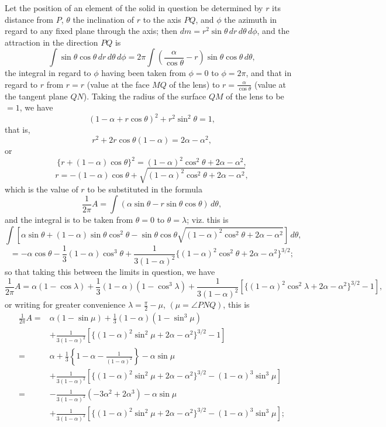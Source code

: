 \documentclass[11pt,a4paper]{article}
\theoremstyle{plain}
\theoremstyle{definition}
\begin{document}
\noindent
Let the position of an element of the solid in question be determined by $r$ its
distance from $P$, $\theta$ the inclination of $r$ to the axis $PQ$, and $\phi$ the
azimuth in regard to any fixed plane through the axis; then
$dm=r^2\sin\theta\,dr\,d\theta\,d\phi$, and the attraction in the direction $PQ$ is
\[
\int\sin\theta\cos\theta\,dr\,d\theta\,d\phi
=2\pi\int\left(\frac{\alpha}{\cos\theta}-r\right)\sin\theta\cos\theta\,d\theta,
\]
the integral in regard to $\phi$ having been taken from $\phi=0$ to $\phi=2\pi$,
and that in regard to $r$ from $r=r$ (value at the face $MQ$ of the lens) to
$r=\frac{\alpha}{\cos\theta}$ (value at the tangent plane $QN$). Taking the radius
of the surface $QM$ of the lens to be $=1$, we have
\[
        (1-\alpha+r\cos\theta)^2+r^2\sin^2\theta=1,
\]
that is,
\[
        r^2+2r\cos\theta(1-\alpha)=2\alpha-\alpha^2,
\]
or
\[
        \{r+(1-\alpha)\cos\theta\}^2=(1-\alpha)^2\cos^2\theta+2\alpha-\alpha^2,
\]
\[
        r=-(1-\alpha)\cos\theta+
        \sqrt{(1-\alpha)^2\cos^2\theta+2\alpha-\alpha^2},
\]
which is the value of $r$ to be substituted in the formula
\[
        \frac{1}{2\pi}A=\int(\alpha\sin\theta-r\sin\theta\cos\theta)\,d\theta,
\]
and the integral is to be taken from $\theta=0$ to $\theta=\lambda$; viz. this is
\[
\int\left[\alpha\sin\theta+(1-\alpha)\sin\theta\cos^2\theta
-\sin\theta\cos\theta\sqrt{(1-\alpha)^2\cos^2\theta+2\alpha-\alpha^2}\right]\,d\theta,
\]
\[
=-\alpha\cos\theta-\frac13(1-\alpha)\cos^3\theta
+\frac{1}{3(1-\alpha)^2}
\{(1-\alpha)^2\cos^2\theta+2\alpha-\alpha^2\}^{3/2};
\]
so that taking this between the limits in question, we have
\[
\frac{1}{2\pi}A=\alpha(1-\cos\lambda)
+\frac13(1-\alpha)(1-\cos^3\lambda)
+\frac{1}{3(1-\alpha)^2}
\left[\{(1-\alpha)^2\cos^2\lambda+2\alpha-\alpha^2\}^{3/2}-1\right],
\]
or writing for greater convenience $\lambda=\frac{\pi}{2}-\mu$,
$(\mu=\angle PNQ)$, this is
\[
\begin{split}
\frac{1}{2\pi}A={}&\alpha(1-\sin\mu)
+\frac13(1-\alpha)(1-\sin^3\mu)\\
&+\frac{1}{3(1-\alpha)^2}
\left[\{(1-\alpha)^2\sin^2\mu+2\alpha-\alpha^2\}^{3/2}-1\right]\\
={}&\alpha+\frac13\left\{1-\alpha-\frac{1}{(1-\alpha)^2}\right\}
-\alpha\sin\mu\\
&+\frac{1}{3(1-\alpha)^2}
\left[\{(1-\alpha)^2\sin^2\mu+2\alpha-\alpha^2\}^{3/2}
-(1-\alpha)^3\sin^3\mu\right]\\
={}&-\frac{1}{3(1-\alpha)^2}(-3\alpha^2+2\alpha^3)-\alpha\sin\mu\\
&+\frac{1}{3(1-\alpha)^2}
\left[\{(1-\alpha)^2\sin^2\mu+2\alpha-\alpha^2\}^{3/2}
-(1-\alpha)^3\sin^3\mu\right];
\end{split}
\]
\clearpage
\end{document}
